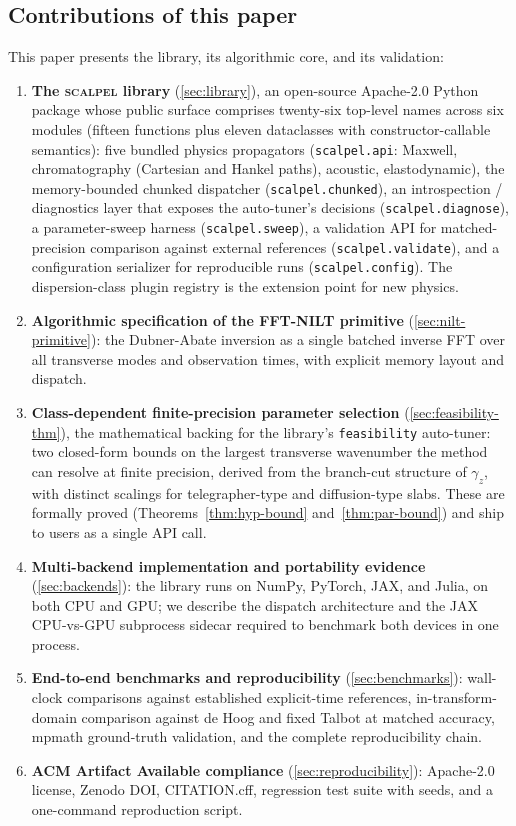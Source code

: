 \documentclass[manuscript,review]{acmart}
\newcommand{\gammaz}{\gamma_z}
\newcommand{\scalpel}{\textsc{scalpel}}
\begin{document}
\subsection{Contributions of this paper}

This paper presents the library, its algorithmic core, and its
validation:

\begin{enumerate}[label=(C\arabic*),leftmargin=*]
\item \textbf{The \scalpel{} library} (\cref{sec:library}), an
open-source Apache-2.0 Python package whose public surface comprises
twenty-six top-level names across six modules (fifteen functions
plus eleven dataclasses with constructor-callable semantics): five
bundled physics propagators (\texttt{scalpel.api}: Maxwell,
chromatography (Cartesian and Hankel paths), acoustic,
elastodynamic), the memory-bounded
chunked dispatcher (\texttt{scalpel.chunked}), an introspection /
diagnostics layer that exposes the auto-tuner's decisions
(\texttt{scalpel.diagnose}), a parameter-sweep harness
(\texttt{scalpel.sweep}), a validation API for matched-precision
comparison against external references (\texttt{scalpel.validate}),
and a configuration serializer for reproducible runs
(\texttt{scalpel.config}). The dispersion-class plugin registry is
the extension point for new physics.
\item \textbf{Algorithmic specification of the FFT-NILT primitive}
(\cref{sec:nilt-primitive}): the Dubner-Abate inversion as a
single batched inverse FFT over all transverse modes and observation
times, with explicit memory layout and dispatch.
\item \textbf{Class-dependent finite-precision parameter selection}
(\cref{sec:feasibility-thm}), the mathematical backing for the
library's \texttt{feasibility} auto-tuner: two closed-form bounds
on the largest transverse wavenumber the method can resolve at
finite precision, derived from the branch-cut structure of $\gammaz$,
with distinct scalings for telegrapher-type and diffusion-type
slabs. These are formally proved (Theorems~\ref{thm:hyp-bound}
and~\ref{thm:par-bound}) and ship to users as a single API call.
\item \textbf{Multi-backend implementation and portability evidence}
(\cref{sec:backends}): the library runs on NumPy, PyTorch, JAX, and
Julia, on both CPU and GPU; we describe the dispatch architecture
and the JAX CPU-vs-GPU subprocess sidecar required to benchmark
both devices in one process.
\item \textbf{End-to-end benchmarks and reproducibility}
(\cref{sec:benchmarks}): wall-clock comparisons against established
explicit-time references, in-transform-domain comparison against
de Hoog and fixed Talbot at matched accuracy, mpmath ground-truth
validation, and the complete reproducibility chain.
\item \textbf{ACM Artifact Available compliance}
(\cref{sec:reproducibility}): Apache-2.0 license, Zenodo DOI,
CITATION.cff, regression test suite with seeds, and a one-command
reproduction script.
\end{enumerate}
\end{document}
